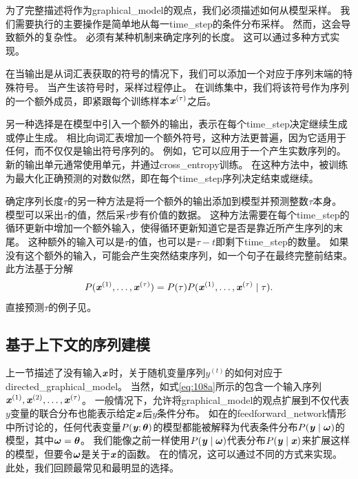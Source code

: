 为了完整描述将作为\gls{graphical_model}的观点，我们必须描述如何从模型采样。
我们需要执行的主要操作是简单地从每一\gls{time_step}的条件分布采样。
然而，这会导致额外的复杂性。
必须有某种机制来确定序列的长度。
这可以通过多种方式实现。

在当输出是从词汇表获取的符号的情况下，我们可以添加一个对应于序列末端的特殊符号\citep{schmidhuber2012self}。
当产生该符号时，采样过程停止。
在训练集中，我们将该符号作为序列的一个额外成员，即紧跟每个训练样本$\boldsymbol{\mathit{x}}^{(\tau)}$之后。


另一种选择是在模型中引入一个额外的输出，表示在每个\gls{time_step}决定继续生成或停止生成。
相比向词汇表增加一个额外符号，这种方法更普遍，因为它适用于任何，而不仅仅是输出符号序列的。
例如，它可以应用于一个产生实数序列的。
新的输出单元通常使用单元，并通过\gls{cross_entropy}训练。
在这种方法中，被训练为最大化正确预测的对数似然，即在每个\gls{time_step}序列决定结束或继续。

确定序列长度$\tau$的另一种方法是将一个额外的输出添加到模型并预测整数$\tau$本身。
模型可以采出$\tau$的值，然后采$\tau$步有价值的数据。
这种方法需要在每个\gls{time_step}的循环更新中增加一个额外输入，使得循环更新知道它是否是靠近所产生序列的末尾。
这种额外的输入可以是$\tau$的值，也可以是$\tau - t$即剩下\gls{time_step}的数量。
如果没有这个额外的输入，可能会产生突然结束序列，如一个句子在最终完整前结束。
此方法基于分解
\begin{align}
 P(\boldsymbol{\mathit{x}}^{(1)},\dots, \boldsymbol{\mathit{x}}^{(\tau)}) = P(\tau) P(\boldsymbol{\mathit{x}}^{(1)},\dots,\boldsymbol{\mathit{x}}^{(\tau)} \mid \tau) .
\end{align}
直接预测$\tau$的例子见\cite{Goodfellow+et+al-ICLR2014a}。

\subsection{基于上下文的序列建模}
\label{sec:modeling_sequences_conditioned_on_context_with_rnns}
上一节描述了没有输入$\boldsymbol{\mathit{x}}$时，关于随机变量序列$y^{(t)}$的如何对应于\gls{directed_graphical_model}。
当然，如式\eqref{eq:108a}所示的包含一个输入序列$\boldsymbol{\mathit{x}}^{(1)},\boldsymbol{\mathit{x}}^{(2)},\dots,\boldsymbol{\mathit{x}}^{(\tau)}$。
一般情况下，允许将\gls{graphical_model}的观点扩展到不仅代表$y$变量的联合分布也能表示给定$\boldsymbol{\mathit{x}}$后$y$条件分布。
如在的\gls{feedforward_network}情形中所讨论的，任何代表变量$P(\boldsymbol{\mathit{y}};\boldsymbol{\theta})$的模型都能被解释为代表条件分布$P(\boldsymbol{\mathit{y}} \mid \boldsymbol{\omega})$的模型，其中$\boldsymbol{\omega}=\boldsymbol{\theta}$。
我们能像之前一样使用$P(\boldsymbol{\mathit{y}} \mid \boldsymbol{\omega})$代表分布$P(\boldsymbol{\mathit{y}} \mid \boldsymbol{\mathit{x}})$来扩展这样的模型，但要令$\boldsymbol{\omega}$是关于$\boldsymbol{\mathit{x}}$的函数。
在的情况，这可以通过不同的方式来实现。
此处，我们回顾最常见和最明显的选择。

